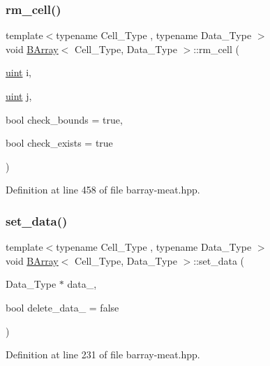 \subsubsection{\texorpdfstring{rm\+\_\+cell()}{rm\_cell()}}
{\footnotesize\ttfamily template$<$typename Cell\+\_\+\+Type , typename Data\+\_\+\+Type $>$ \\
void \hyperlink{class_b_array}{B\+Array}$<$ Cell\+\_\+\+Type, Data\+\_\+\+Type $>$\+::rm\+\_\+cell (\begin{DoxyParamCaption}\item[{\hyperlink{typedefs_8hpp_a91ad9478d81a7aaf2593e8d9c3d06a14}{uint}}]{i,  }\item[{\hyperlink{typedefs_8hpp_a91ad9478d81a7aaf2593e8d9c3d06a14}{uint}}]{j,  }\item[{bool}]{check\+\_\+bounds = {\ttfamily true},  }\item[{bool}]{check\+\_\+exists = {\ttfamily true} }\end{DoxyParamCaption})\hspace{0.3cm}{\ttfamily [inline]}}



Definition at line 458 of file barray-\/meat.\+hpp.

\mbox{\label{class_b_array_accf44b49caa7746a462a3ac9b6024cfc}} 
\subsubsection{\texorpdfstring{set\+\_\+data()}{set\_data()}}
{\footnotesize\ttfamily template$<$typename Cell\+\_\+\+Type , typename Data\+\_\+\+Type $>$ \\
void \hyperlink{class_b_array}{B\+Array}$<$ Cell\+\_\+\+Type, Data\+\_\+\+Type $>$\+::set\+\_\+data (\begin{DoxyParamCaption}\item[{Data\+\_\+\+Type $\ast$}]{data\+\_\+,  }\item[{bool}]{delete\+\_\+data\+\_\+ = {\ttfamily false} }\end{DoxyParamCaption})\hspace{0.3cm}{\ttfamily [inline]}}



Definition at line 231 of file barray-\/meat.\+hpp.

\mbox{\label{class_b_array_afb7976f67770b850922c1a7e1d6b07cc}} 
